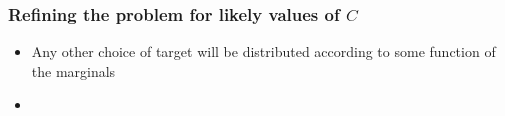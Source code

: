 \documentclass{beamer}
\newcommand{\BATCH}{{\texttt{B}}}
\newcommand{\TARGET}{{Y}}
\newcommand{\FEATURE}{{X}}
\newcommand{\TRN}{{\texttt{Train}}}
\newcommand{\TST}{{\texttt{Test}}}
\newcommand{\PRD}{{\texttt{Prod}}}
\newcommand{\STAT}{{S}}
\newcommand{\Pred}[1][y]{{\hat{#1}}}
\newcommand{\STATPRED}{\Pred[\STAT]}
\newcommand{\FPE}{{\widehat{\texttt{FP}}}}
\newcommand{\FNE}{{\widehat{\texttt{FN}}}}
\begin{document}
  \begin{frame}
    \frametitle{Refining the problem for likely values of $C$}
  \begin{itemize}
  \item
    Any other choice of target will be distributed according to some function of the marginals
  \item
    
  \end{itemize}
\end{frame}
%
\end{document}
